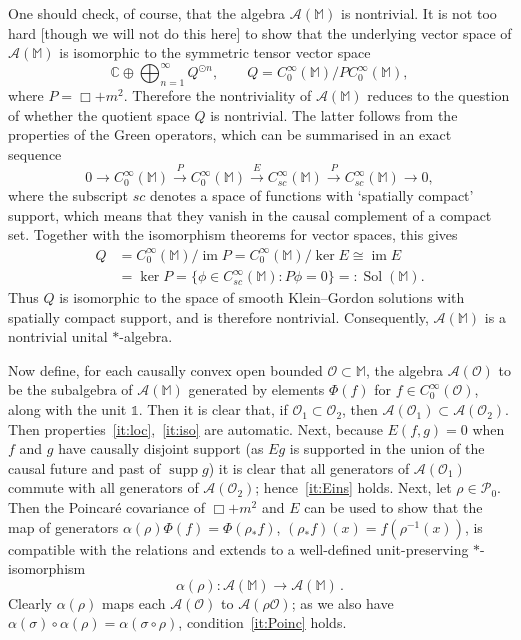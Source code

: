 \documentclass[12pt]{article}
\newcommand{\1}{\mathds{1}}                         %
\newcommand{\CC}{\mathbb{C}}           %
\newcommand{\Ocal}{\mathcal{O}}
\newcommand{\MM}{\mathbb{M}}
\newcommand{\II}{{\mathbb{1}}}
\newcommand{\Ac}{{\mathcal{A}}}
\newcommand{\Pc}{{\mathcal{P}}}
\newcommand{\CoinX}[1]{C_0^\infty(#1)}
\DeclareMathOperator{\im}{im}
\DeclareMathOperator{\supp}{supp}
\DeclareMathOperator{\Sol}{Sol}
\begin{document}
	One should check, of course, that the algebra $\Ac(\MM)$ is nontrivial. It is not too hard [though we will not do this here] to show that the underlying vector space of $\Ac(\MM)$ is isomorphic to the symmetric tensor vector space
	\[
	\CC \oplus \bigoplus_{n=1}^\infty Q^{\odot n}, \qquad Q = \CoinX{\MM}/P \CoinX{\MM},
	\]
	where $P=\Box+m^2$. Therefore the nontriviality of $\Ac(\MM)$ reduces to the question of whether the quotient space $Q$ is nontrivial. 
	The latter follows from the properties of the Green operators, which can be summarised in an exact sequence~\cite{BarGinouxPfaffle}
	\begin{equation}\label{eq:exactsequence}
	0 \longrightarrow \CoinX{\MM}\stackrel{P}{\longrightarrow}  \CoinX{\MM} \stackrel{E}{\longrightarrow}
	C^\infty_{\textit{sc}} (\MM) \stackrel{P}{\longrightarrow}C^\infty_{\textit{sc}} (\MM) \longrightarrow 0,
	\end{equation} 
	where the subscript $sc$ denotes a space of functions with `spatially compact' support, which means that they vanish in the causal complement of a compact set. Together with the isomorphism theorems for vector spaces, this gives
	\begin{align}
	Q & = \CoinX{\MM}/\im P = \CoinX{\MM}/\ker E \cong \im E \nonumber \\
	& = \ker P =\{\phi\in C^\infty_{\textit{sc}} (\MM): P\phi=0\}=:\Sol(\MM).
	\end{align}
	Thus $Q$ is isomorphic to the space of smooth Klein--Gordon solutions with spatially compact support, and is therefore nontrivial. Consequently, $\Ac(\MM)$ is a nontrivial unital $*$-algebra.
	
	Now define, for each causally convex open bounded $\Ocal\subset\MM$, the algebra $\Ac(\Ocal)$ to be the subalgebra of $\Ac(\MM)$ generated by elements $\Phi(f)$ for $f\in\CoinX{\Ocal}$, along with the unit $\II$. 
	Then it is clear that, if $\Ocal_1\subset \Ocal_2$, then $\Ac(\Ocal_1)\subset \Ac(\Ocal_2)$. Then properties~\ref{it:loc},~\ref{it:iso} are automatic.
	Next, because $E(f,g)=0$ when $f$ and $g$ have causally disjoint support (as $Eg$ is supported in the union of the causal future and past of $\supp g$) it is clear that all generators of $\Ac(\Ocal_1)$ commute with all generators of $\Ac(\Ocal_2)$; hence~\ref{it:Eins} holds. Next, let $\rho\in\Pc_0$. Then the Poincar\'e covariance of $\Box+m^2$ and $E$ can be used to show that
	the map of generators $\alpha(\rho)\Phi(f) = \Phi(\rho_* f)$, $(\rho_*f)(x)=f(\rho^{-1}(x))$, is compatible with the relations and extends to a well-defined unit-preserving $*$-isomorphism
	\begin{equation}
	\alpha(\rho):\Ac(\MM)\to\Ac(\MM)\,.
	\end{equation}
	Clearly $\alpha(\rho)$ maps each $\Ac(\Ocal)$ to $\Ac(\rho\Ocal)$; as we also have $\alpha(\sigma)\circ\alpha(\rho)=\alpha(\sigma\circ\rho)$,  condition~\ref{it:Poinc} holds. 
	
\end{document}
